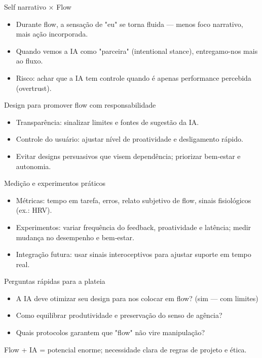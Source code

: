 \documentclass[aspectratio=169,12pt]{beamer}
\begin{document}
\begin{frame}{Self narrativo × Flow}
  \begin{itemize}
    \item Durante flow, a sensação de "eu" se torna fluida — menos foco narrativo, mais ação incorporada.
    \item Quando vemos a IA como "parceira" (intentional stance), entregamo-nos mais ao fluxo.
    \item Risco: achar que a IA tem controle quando é apenas performance percebida (overtrust).
  \end{itemize}
\end{frame}

\begin{frame}{Design para promover flow com responsabilidade}
  \begin{itemize}
    \item Transparência: sinalizar limites e fontes de sugestão da IA.
    \item Controle do usuário: ajustar nível de proatividade e desligamento rápido.
    \item Evitar designs persuasivos que visem dependência; priorizar bem‑estar e autonomia. \faCheckCircle
  \end{itemize}
\end{frame}

\begin{frame}{Medição e experimentos práticos}
  \begin{itemize}
    \item Métricas: tempo em tarefa, erros, relato subjetivo de flow, sinais fisiológicos (ex.: HRV).
    \item Experimentos: variar frequência do feedback, proatividade e latência; medir mudança no desempenho e bem‑estar.
    \item Integração futura: usar sinais interoceptivos para ajustar suporte em tempo real.
  \end{itemize}
\end{frame}

\begin{frame}{Perguntas rápidas para a plateia}
  \begin{itemize}
    \item A IA deve otimizar seu design para nos colocar em flow? (sim — com limites)
    \item Como equilibrar produtividade e preservação do senso de agência?
    \item Quais protocolos garantem que "flow" não vire manipulação?
  \end{itemize}
  Flow + IA = potencial enorme; necessidade clara de regras de projeto e ética. 
\end{frame}
\end{document}
